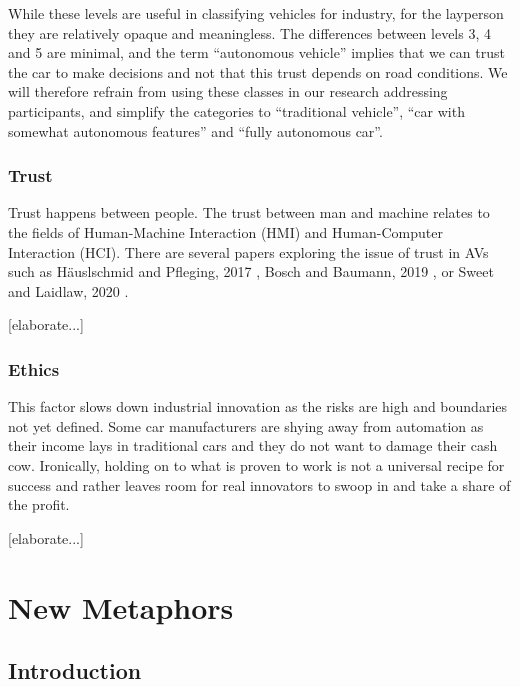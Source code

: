 \documentclass[12pt, usenames, dvipsnames]{report}
\begin{document}
\begin{flushleft}
While these levels are useful in classifying vehicles for industry, for the layperson they are relatively opaque and meaningless.
The differences between levels 3, 4 and 5 are minimal, and the term ``autonomous vehicle'' implies that we can trust the car to make decisions and not that this trust depends on road conditions.
We will therefore refrain from using these classes in our research addressing participants, and simplify the categories to ``traditional vehicle'', ``car with somewhat autonomous features'' and ``fully autonomous car''.

\subsection{Trust}
\label{sec:trust}

Trust happens between people. 
The trust between man and machine relates to the fields of Human-Machine Interaction (HMI) and Human-Computer Interaction (HCI).
There are several papers exploring the issue of trust in AVs such as Häuslschmid and Pfleging, 2017 \cite{haeuslschmid2017}, Bosch and Baumann, 2019 \cite{bosch2019}, or Sweet and Laidlaw, 2020 \cite{sweet2020}.

[elaborate...]

\subsection{Ethics}

This factor slows down industrial innovation as the risks are high and boundaries not yet defined.
Some car manufacturers are shying away from automation as their income lays in traditional cars and they do not want to damage their cash cow.
Ironically, holding on to what is proven to work is not a universal recipe for success and rather leaves room for real innovators to swoop in and take a share of the profit.

[elaborate...]


\chapter{New Metaphors}
\label{sec:newmetaphors}

\section*{Introduction}


\end{flushleft}
\end{document}
